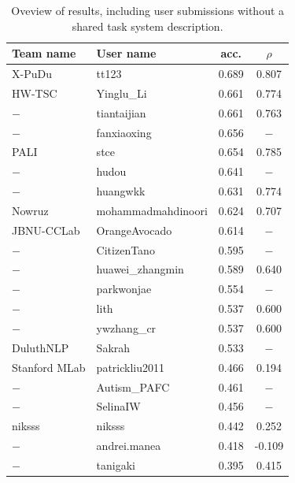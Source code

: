 \documentclass[11pt]{article}
\begin{document}
\begin{table}[!th]
    \small
    \begin{tabular}{@{}llcc@{}}
    \toprule
    Team name & User name & acc. & $\rho$\\
    \midrule
X-PuDu & tt123        & 0.689 & 0.807 \\
HW-TSC & Yinglu\_Li    & 0.661 & 0.774 \\
$-$ & tiantaijian	& 0.661 & 0.763 \\
$-$ & fanxiaoxing	& 0.656 & $-$ \\
PALI & stce         & 0.654 & 0.785 \\
$-$ & hudou	    & 0.641 & $-$ \\
$-$ & huangwkk     & 0.631 & 0.774 \\
Nowruz & mohammadmahdinoori & 0.624 & 0.707 \\
JBNU-CCLab & OrangeAvocado& 0.614 & $-$ \\
$-$ & CitizenTano	& 0.595 & $-$ \\
$-$ & huawei\_zhangmin & 0.589 & 0.640 \\
$-$ & parkwonjae	& 0.554 & $-$ \\
$-$ & lith	        & 0.537 & 0.600 \\
$-$ & ywzhang\_cr	& 0.537 & 0.600 \\
DuluthNLP & Sakrah	    & 0.533 & $-$ \\
Stanford MLab & patrickliu2011 & 0.466 & 0.194 \\
$-$ & Autism\_PAFC	& 0.461 & $-$ \\
$-$ & SelinaIW     & 0.456 & $-$ \\
niksss & niksss	    & 0.442 & 0.252 \\
$-$ & andrei.manea & 0.418 & -0.109 \\
$-$ & tanigaki	    & 0.395 & 0.415 \\
    \bottomrule
    \end{tabular}
    \caption{Oveview of results, including user submissions without a shared task system description.}
    \label{tab:allresults}
\end{table}
\end{document}
